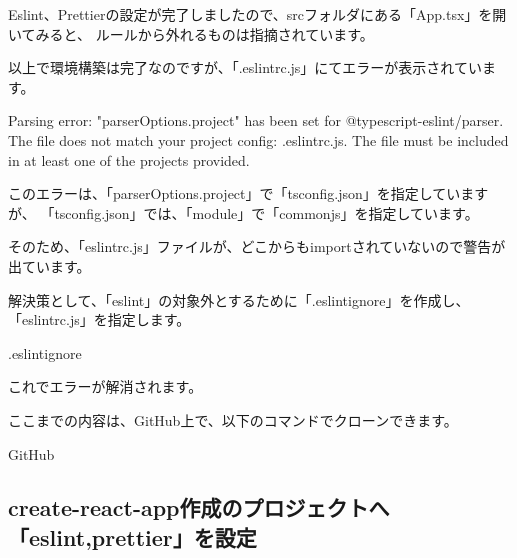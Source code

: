 Eslint、Prettierの設定が完了しましたので、srcフォルダにある「App.tsx」を開いてみると、
ルールから外れるものは指摘されています。

\vspace*{\baselineskip}

以上で環境構築は完了なのですが、「.eslintrc.js」にてエラーが表示されています。

\begin{starterquote}

Parsing error: "parserOptions.project" has been set for @typescript{-}eslint/parser.
The file does not match your project config: .eslintrc.js.
The file must be included in at least one of the projects provided.

\end{starterquote}

このエラーは、「parserOptions.project」で「tsconfig.json」を指定していますが、
「tsconfig.json」では、「module」で「commonjs」を指定しています。

\vspace*{\baselineskip}

そのため、「eslintrc.js」ファイルが、どこからもimportされていないので警告が出ています。

\vspace*{\baselineskip}

解決策として、「eslint」の対象外とするために「.eslintignore」を作成し、「eslintrc.js」を指定します。

\def\startercodeblockfontsize{}
\begin{starterprogram}[]{.eslintignore}\end{starterprogram}

これでエラーが解消されます。

\begin{starternote}[]{}

ここまでの内容は、GitHub上で、以下のコマンドでクローンできます。

\def\startercodeblockfontsize{}
\begin{starterterminal}[]{GitHub}\end{starterterminal}
\end{starternote}

\subsection{create{-}react{-}app作成のプロジェクトへ「eslint,prettier」を設定}
\keeplastskip{
  \label{sec:2-3-2}
  \label{sec04-cra-with-eslint}
  \par\nobreak
}

